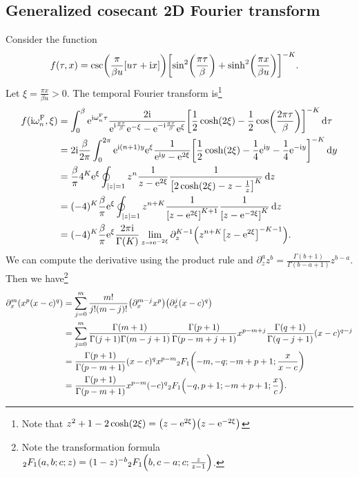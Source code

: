 \documentclass[english, parskip=full]{scrartcl}
\begin{document}
\subsection{Generalized cosecant 2D Fourier transform}
Consider the function
\begin{align}
f(\tau, x) &= \csc\kla*{\frac{\pi}{\beta u} \klb*{u\tau + \i x}} \klb*{\sin^2\kla*{\frac{\pi \tau}{\beta}} + \sinh^2\kla*{\frac{\pi x}{\beta u}}}^{-K}.
\end{align}
Let $\xi = \frac{\pi x}{\beta u} > 0$.
The temporal Fourier transform is\footnote{Note that $z^2 + 1 - 2\cosh (2\xi) = \kla*{z - \powe{2\xi}} \kla*{z - \powe{-2\xi}}$}
\begin{align}
f(\i\omega_n^\F, \xi) &= \intx{0}{\beta}{\powe{\i\omega_n^\F \tau} \frac{2\i}{\powe{\i \frac{\pi\tau}{\beta}} \powe{- \xi} - \powe{-\i \frac{\pi\tau}{\beta}} \powe{\xi}} \klb*{\frac{1}{2}\cosh\kla*{2\xi} - \frac{1}{2} \cos\kla*{\frac{2\pi\tau}{\beta}}}^{-K}}{\tau}\\
&= 2\i \frac{\beta}{2\pi} \intx{0}{2\pi}{\powe{\i (n+1) y} \powe{\xi} \frac{1}{\powe{\i y} - \powe{2\xi}} \klb*{\frac{1}{2} \cosh\kla*{2\xi} - \frac{1}{4} \powe{\i y} - \frac{1}{4} \powe{-\i y}}^{-K}}{y}\\
&= \frac{\beta}{\pi} 4^K \powe{\xi} \oint_{|z|=1} z^n \frac{1}{z - \powe{2\xi}} \frac{1}{\klb*{2\cosh\kla*{2\xi} - z - \frac{1}{z}}^K}\,\d z\\
&= (-4)^K \frac{\beta}{\pi} \powe{\xi} \oint_{|z|=1} z^{n+K} \frac{1}{\klb*{z - \powe{2\xi}}^{K+1}} \frac{1}{\klb*{z - \powe{-2\xi}}^K}\,\d z\\
&= (-4)^K \frac{\beta}{\pi} \powe{\xi} \frac{2\pi\i}{\Gamma(K)} \lim_{z\rightarrow \powe{-2\xi}} \partial_z^{K-1} \kla*{z^{n+K} \klb*{z - \powe{2\xi}}^{-K-1}}.
\end{align}
We can compute the derivative using the product rule and $\partial_z^a z^b = \frac{\Gamma(b+1)}{\Gamma(b-a+1)} z^{b-a}$.
Then we have\footnote{Note the transformation formula ${}_2F_1\kla*{a,b;c;z} = (1-z)^{-b} {}_2F_1\kla*{b,c-a;c; \frac{z}{z-1}}$.}
\begin{align}
\partial_x^m \kla*{x^p (x-c)^q} &= \sum_{j=0}^m \frac{m!}{j!(m-j)!} \kla*{\partial_x^{m-j} x^p} \kla*{\partial_x^j (x-c)^q}\\
&= \sum_{j=0}^m \frac{\Gamma(m+1)}{\Gamma(j+1) \Gamma(m-j+1)} \frac{\Gamma(p+1)}{\Gamma(p-m+j+1)} x^{p-m+j} \frac{\Gamma(q+1)}{\Gamma(q-j+1)} (x-c)^{q-j} \\
&= \frac{\Gamma(p+1)}{\Gamma(p-m+1)} (x - c)^q x^{p - m} {}_2F_1\kla*{-m, -q; -m + p + 1; \frac{x}{x - c}}\\
&= \frac{\Gamma(p+1)}{\Gamma(p-m+1)} x^{p - m} (-c)^q {}_2F_1\kla*{-q, p+1; -m + p + 1; \frac{x}{c}}. \label{eqn:product_rule_hypergeometric}
\end{align}
\end{document}
